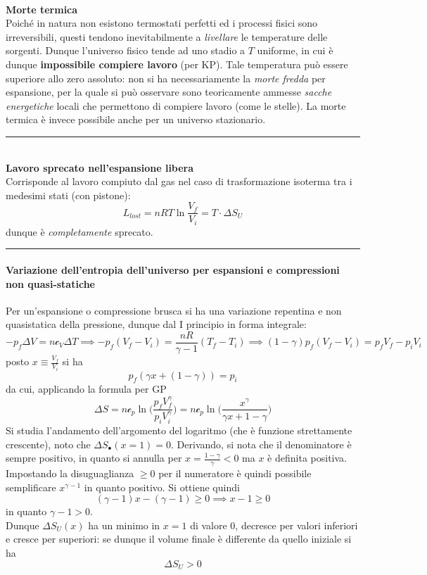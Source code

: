 \documentclass[10pt, oneside]{book}
\newcommand{\deltas}[1]{\Delta S_{#1}}
\newcommand{\infobox}[2]{\vspace{0.5cm}~\\ \textbf{#1} \hrulefill \vspace{0.2cm}\\#2 {}\,\\\hrule \vspace{0.5cm}}
\newcommand{\ds}{\displaystyle}
\newcommand{\molhtv}{\mathcal{c}_V }
\newcommand{\molhtp}{\mathcal{c}_p }
\begin{document}
\infobox{Morte termica}{Poiché in natura non esistono termostati perfetti ed i processi fisici sono irreversibili, questi tendono inevitabilmente a \textit{livellare} le temperature delle sorgenti. Dunque l'universo fisico tende ad uno stadio a $T$ uniforme, in cui è dunque \textbf{impossibile compiere lavoro} (per KP). Tale temperatura può essere superiore allo zero assoluto: non si ha necessariamente la \textit{morte fredda} per espansione, per la quale si può osservare sono teoricamente ammesse \textit{sacche energetiche} locali che permettono di compiere lavoro (come le stelle). La morte termica è invece possibile anche per un universo stazionario.}

\infobox{Lavoro sprecato nell'espansione libera}{Corrisponde al lavoro compiuto dal gas nel caso di trasformazione isoterma tra i medesimi stati (con pistone):
\[L_{lost} = n R T \ln \frac{V_f}{V_i} = T \cdot \Delta S_U\]
dunque è \textit{completamente} sprecato.
}

\paragraph{Variazione dell'entropia dell'universo per espansioni e compressioni non quasi-statiche} 
Per un'espansione o compressione brusca si ha una variazione repentina e non quasistatica della pressione, dunque dal I principio in forma integrale:
\[-p_f \Delta V = n \molhtv \Delta T \implies -p_f (V_f - V_i) = \frac{nR}{\gamma - 1}(T_f - T_i) \implies (1-\gamma) p_f (V_f - V_i) = p_fV_f - p_i V_i\]
posto $\ds x \equiv \frac{V_f}{V_i}$ si ha
\[p_f (\gamma x + (1-\gamma)) = p_i\]
da cui, applicando la formula per GP
\[\Delta S = n \molhtp \ln \bigg( \frac{p_f V_f^\gamma}{p_i V_i^\gamma} \bigg) = n \molhtp \ln \bigg( \frac{x^\gamma}{\gamma x + 1 - \gamma} \bigg)\]
Si studia l'andamento dell'argomento del logaritmo (che è funzione strettamente crescente), noto che $\deltas{•}(x=1) = 0$. Derivando, si nota che il denominatore è sempre positivo, in quanto si annulla per $\ds x = \frac{1-\gamma}{\gamma} < 0$ ma $x$ è definita positiva. Impostando la disuguaglianza $\geq 0$ per il numeratore è quindi possibile semplificare $x^{\gamma -1}$ in quanto positivo. Si ottiene quindi
\[(\gamma - 1) x - (\gamma - 1) \geq 0 \implies x - 1 \geq 0\]
in quanto $\gamma -1 > 0$. \\
Dunque $\deltas{U}(x)$ ha un minimo in $x=1$ di valore $0$, decresce per valori inferiori e cresce per superiori: se dunque il volume finale è differente da quello iniziale si ha
\[\deltas{U} > 0\]
\end{document}
